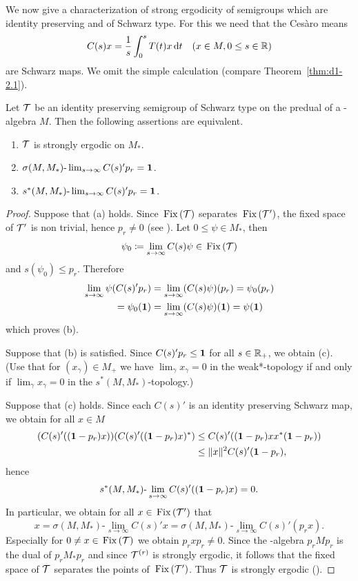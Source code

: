 We now give a characterization of strong ergodicity of semigroups which are identity preserving and of Schwarz type.
For this we need that the Cesàro means
\[
C(s)x = \frac{1}{s}\int_{0}^{s} T(t)x \dt \quad (x \in M, 0 \leq s \in \R)
\]
are Schwarz maps.
We omit the simple calculation (compare Theorem~\ref{thm:d1-2.1}).
\begin{proposition}\label{prop:d4-3.3}
Let $\mathcal{T}$ be an identity preserving semigroup of Schwarz type on the predual of a \WA-algebra $M$.
Then the following assertions are equivalent.
\begin{enumerate}[\upshape (a)]
\item
$\mathcal{T}$ is strongly ergodic on $M_{*}$.

\item
$\sigma(M,M_{*})\text{-}\lim_{s \to \infty} C(s)'p_{r} = \mathbf{1}$.

\item
$s^{*}(M,M_{*})\text{-}\lim_{s \to \infty} C(s)'p_{r} = \mathbf{1}$.
\end{enumerate}
\end{proposition}
\begin{proof}
Suppose that (a) holds.
Since $\mathop{}\mathrm{Fix}\left(\mathcal{T}\right)$ separates $\mathop{}\mathrm{Fix}\left(\mathcal{T}'\right)$, the fixed space of\/ $\mathcal{T}'$ is non trivial, hence $p_{r} \neq 0$ (see \textcite[Chap.2, Theorem1.4]{krengel:1985}).
Let $0 \leq \psi \in M_{*}$, then 
%
\[
	\psi_{0} \coloneqq \lim_{s \to \infty} C(s)\psi \in \mathop{}\mathrm{Fix}\left(\mathcal{T}\right)
\]
%
and $s(\psi_{0}) \leq p_{r}$.
Therefore
\begin{align*}
\lim_{s \to \infty} \psi(C(s)'p_{r}) &= \lim_{s \to \infty} (C(s)\psi)(p_{r})  = \psi_{0}(p_{r})  \\
= \psi_{0}(\mathbf{1}) &= \lim_{s \to \infty} (C(s)\psi)(\mathbf{1}) = \psi(\mathbf{1})
\end{align*}
which proves (b).

Suppose that (b) is satisfied.
Since $C(s)'p_{r} \leq \1$ for all $s \in \mathbb{R}_{+}$, we obtain (c).
(Use that for $(x_{\gamma}) \in M_{+}$ we have $\lim_{\gamma}x_{\gamma} = 0$ in the weak*-topology if and only if\/ $\lim_{\gamma}x_{\gamma} = 0$ in the $s^{*}(M,M_{*})$-topology.)

Suppose that (c) holds.
Since each $C(s)'$ is an identity preserving Schwarz map, we obtain for all $x \in M$
\begin{align*}
	\mleft( C(s)'((\1-p_{r})x))(C(s)'((\1-p_{r})x)^{*} \mright) 
			&\leq C(s)'((\1-p_{r})xx^{*}(\1-p_{r}))  \\
 	&\leq \|x\|^2 C(s)'(\1-p_{r}),
\end{align*}
hence
\[
s^{*}(M,M_{*})\text{-}\lim_{s \to \infty} C(s)'((\mathbf{1}-p_{r})x) = 0.
\]
In particular, we obtain for all $x \in \mathop{}\mathrm{Fix}\left(\mathcal{T}'\right)$ that 
\[
x = \sigma(M,M_{*})\text{-}\lim_{s \to \infty} C(s)'x = \sigma(M,M_{*})\text{-}\lim_{s \to \infty} C(s)'(p_{r}x) .
\]
Especially for $0 \neq x \in \mathop{}\mathrm{Fix}\left(\mathcal{T}\right)$ we obtain $p_{r}xp_{r} \neq 0$.
Since the \WA-algebra $p_{r}Mp_{r}$ is the dual of\/ $p_{r}M_{*}p_{r}$ and since $\mathcal{T}^{(r)}$ is strongly ergodic, it follows that the fixed space of\/ $\mathcal{T}$ separates the points of\/ $\mathop{}\mathrm{Fix}\left(\mathcal{T}'\right)$.
Thus $\mathcal{T}$ is strongly ergodic (\textcite[Chap. 2, Theorem 1.4]{krengel:1985}).
\end{proof}
